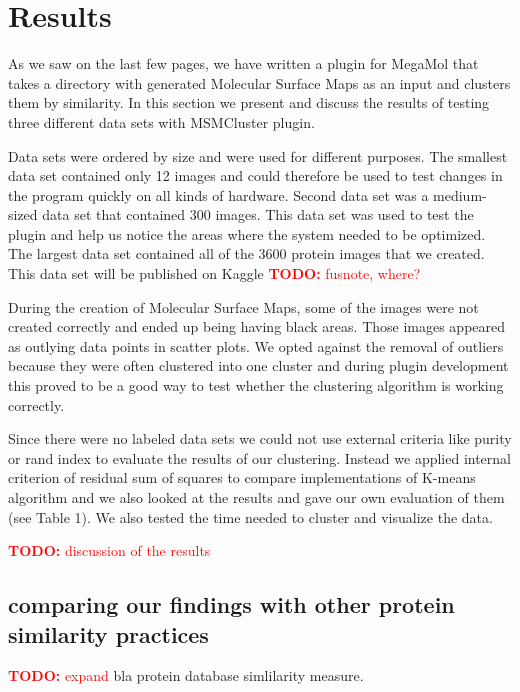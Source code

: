 \documentclass[journal]{vgtc}       %
\newcommand{\todo}[1]{\textcolor{red}{\textbf{TODO:} #1}}
\begin{document}
\section{Results}
As we saw on the last few pages, we have written a plugin for MegaMol that takes a directory with generated Molecular Surface Maps as an input and clusters  them by similarity. In this section we present and discuss the results of testing three different data sets with MSMCluster plugin. 

Data sets were ordered by size and were used for different purposes. The smallest data set contained only 12 images and could therefore be used to test changes in the program quickly on all kinds of hardware. Second data set was a medium-sized data set that contained 300 images. This data set was used to test the plugin and help us notice the areas where the system needed to be optimized. The largest data set contained all of the 3600 protein images that we created. This data set will be published on Kaggle  \todo{fusnote, where?}

During the creation of Molecular Surface Maps, some of the images were not created correctly and ended up being having black areas. Those images appeared as outlying data points in scatter plots. We opted against the removal of outliers because they were often clustered into one cluster and during plugin development this proved to be a good way to test whether the clustering algorithm is working correctly.

Since there were no labeled data sets we could not use external criteria like purity or rand index to evaluate the results of our clustering. Instead we applied internal criterion of residual sum of squares to compare implementations of K-means algorithm and we also looked at the results and gave our own evaluation of them (see Table 1). We also tested the time needed to cluster and visualize the data.

\todo{discussion of the results} 



\subsection{comparing our findings with other protein similarity practices}\label{subsec:comparison}
\todo{expand} bla \cite{3dsurfer} protein database simlilarity measure.
\end{document}
